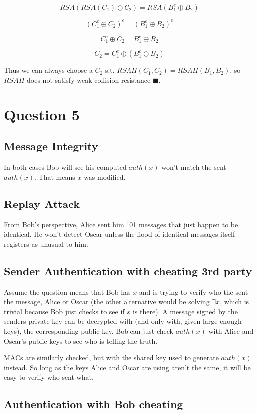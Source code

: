 \documentclass[a4paper,10pt]{article}
\begin{document}
$$RSA(RSA(C_{1}) \oplus C_{2} ) =  RSA(B_{1}^{e} \oplus B_{2} )$$

$$(C_{1}^{e} \oplus C_{2} )^{e} =  (B_{1}^{e} \oplus B_{2} )^{e}$$

$$C_{1}^{e} \oplus C_{2} =  B_{1}^{e} \oplus B_{2} $$

$$C_{2} =  C_{1}^{e} \oplus (B_{1}^{e} \oplus B_{2}) $$


Thus we can always choose a $C_{2}$ s.t. $RSAH(C_{1},C_{2}) = RSAH(B_{1},B_{2})$, so $RSAH$ does not satisfy weak collision resistance $\blacksquare$.
\pagebreak

\section{Question 5}

\subsection{Message Integrity}
In both cases Bob will see his computed $auth(x)$ won't match the sent $auth(x)$.  That means $x$ was modified.

\subsection{Replay Attack} 
From Bob's perspective, Alice sent him 101 messages that just happen to be identical.  He won't detect Oscar unless the flood of identical messages itself registers as unusual to him. 

\subsection{Sender Authentication with cheating 3rd party}
Assume the question means that Bob has $x$ and is trying to verify who the sent the message, Alice or Oscar (the other alternative would be solving $\exists x$, which is trivial because Bob just checks to see if $x$ is there).  A message signed by the senders private key can be decrypted with (and only with, given large enough keys), the corresponding public key.  Bob can just check $auth(x)$ with Alice and Oscar's public keys to see who is telling the truth.

MACs are similarly checked, but with the shared key used to generate $auth(x)$ instead.  So long as the keys Alice and Oscar are using aren't the same, it will be easy to verify who sent what.

\subsection{Authentication with Bob cheating}
\end{document}
